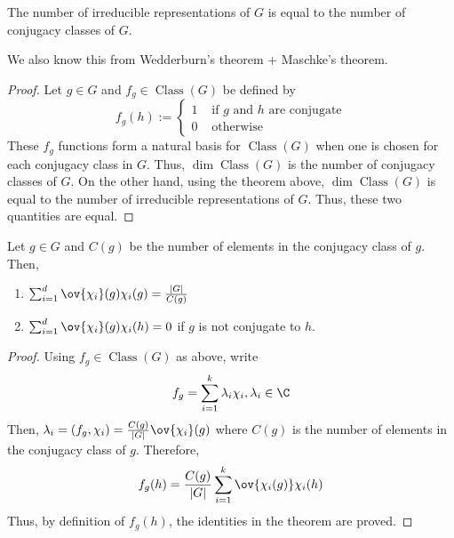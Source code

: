 \documentclass[11pt,leqno,oneside]{amsbook}
\newcommand{\Class}{\operatorname{Class}}
\numberwithin{thm}{section}
\begin{document}
\begin{cor}
  The number of irreducible
  representations of \(G\) is equal to the number of
  conjugacy classes of \(G\).
\end{cor}
\begin{rmk}
  We also know this from Wedderburn's theorem + Maschke's theorem.
\end{rmk}
\begin{proof}
  Let \(g \in G\) and \(f_g \in \Class(G)\) be defined by \[
    f_g(h) :=
    \begin{cases}
      1 & \text{ if }g \text{ and }h\text{ are conjugate} \\
      0 & \text{ otherwise}
    \end{cases}
  \]
  These \(f_g\) functions form a natural basis for \(\Class(G)\) when
  one is chosen for each conjugacy class in \(G\). Thus, \(\dim
  \Class(G)\) is the number of conjugacy classes of \(G\). On the
  other hand, using the theorem above, \(\dim \Class(G)\) is equal to
  the number of irreducible representations of \(G\). Thus, these two
  quantities are equal.
\end{proof}
\begin{thm}
  Let \(g \in G\) and \(C(g)\) be the number of elements in the
  conjugacy class of \(g\). Then,
  \begin{enumerate}
  \item \(\sum_{i=1}^d \ov{\chi_i}(g) \chi_i(g) = \frac{|G|}{C(g)}\)
  \item \(\sum_{i=1}^d \ov{\chi_i}(g) \chi_i(h) = 0\) if \(g\) is not
    conjugate to \(h\).
  \end{enumerate}
\end{thm}
\begin{proof}
  Using \(f_g \in \Class(G)\) as above, write \[
    f_g = \sum_{i=1}^k \lambda_i \chi_i, \lambda_i \in \C
  \]
  Then, \(\lambda_i = (f_g, \chi_i) = \frac{C(g)}{|G|}
  \ov{\chi_i}(g)\) where \(C(g)\) is the number of elements in the
  conjugacy class of \(g\). Therefore, \[
    f_g(h) = \frac{C(g)}{|G|} \sum_{i=1}^k \ov{\chi_i(g)} \chi_i(h)
  \]
  Thus, by definition of \(f_g(h)\), the identities in the theorem are proved.
\end{proof}
\end{document}

